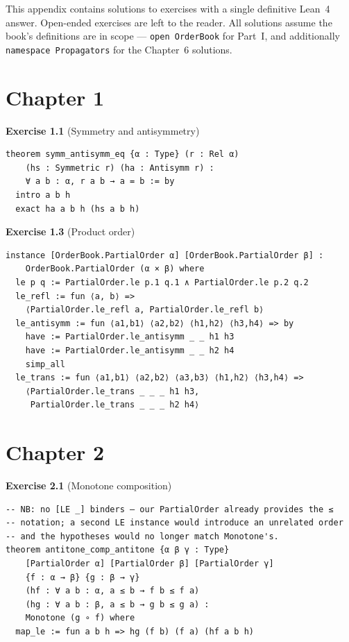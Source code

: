 \documentclass[12pt, a4paper, openright]{book}
\theoremstyle{thmstyle}
\theoremstyle{defstyle}
\newcommand{\lc}[1]{\texttt{#1}}
\newcounter{exercise}[chapter]
\begin{document}
This appendix contains solutions to exercises with a single definitive
Lean~4 answer. Open-ended exercises are left to the reader. All solutions
assume the book's definitions are in scope --- \lc{open OrderBook} for
Part~I, and additionally \lc{namespace Propagators} for the Chapter~6
solutions.

\section*{Chapter 1}

\textbf{Exercise 1.1} (Symmetry and antisymmetry)

\begin{verbatim}
theorem symm_antisymm_eq {α : Type} (r : Rel α)
    (hs : Symmetric r) (ha : Antisymm r) :
    ∀ a b : α, r a b → a = b := by
  intro a b h
  exact ha a b h (hs a b h)
\end{verbatim}

\textbf{Exercise 1.3} (Product order)

\begin{verbatim}
instance [OrderBook.PartialOrder α] [OrderBook.PartialOrder β] :
    OrderBook.PartialOrder (α × β) where
  le p q := PartialOrder.le p.1 q.1 ∧ PartialOrder.le p.2 q.2
  le_refl := fun ⟨a, b⟩ =>
    ⟨PartialOrder.le_refl a, PartialOrder.le_refl b⟩
  le_antisymm := fun ⟨a1,b1⟩ ⟨a2,b2⟩ ⟨h1,h2⟩ ⟨h3,h4⟩ => by
    have := PartialOrder.le_antisymm _ _ h1 h3
    have := PartialOrder.le_antisymm _ _ h2 h4
    simp_all
  le_trans := fun ⟨a1,b1⟩ ⟨a2,b2⟩ ⟨a3,b3⟩ ⟨h1,h2⟩ ⟨h3,h4⟩ =>
    ⟨PartialOrder.le_trans _ _ _ h1 h3,
     PartialOrder.le_trans _ _ _ h2 h4⟩
\end{verbatim}

\section*{Chapter 2}

\textbf{Exercise 2.1} (Monotone composition)

\begin{verbatim}
-- NB: no [LE _] binders — our PartialOrder already provides the ≤
-- notation; a second LE instance would introduce an unrelated order
-- and the hypotheses would no longer match Monotone's.
theorem antitone_comp_antitone {α β γ : Type}
    [PartialOrder α] [PartialOrder β] [PartialOrder γ]
    {f : α → β} {g : β → γ}
    (hf : ∀ a b : α, a ≤ b → f b ≤ f a)
    (hg : ∀ a b : β, a ≤ b → g b ≤ g a) :
    Monotone (g ∘ f) where
  map_le := fun a b h => hg (f b) (f a) (hf a b h)
\end{verbatim}
\end{document}
